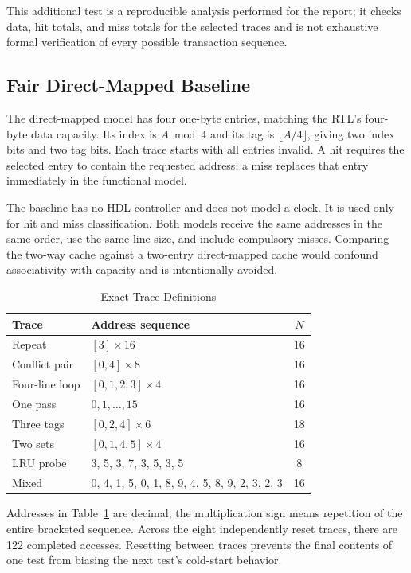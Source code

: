 \documentclass[conference]{IEEEtran}
\begin{document}
This additional test is a reproducible analysis performed for the
report; it checks data, hit totals, and miss totals for the selected
traces and is not exhaustive formal verification of every possible
transaction sequence.

\subsection{Fair Direct-Mapped Baseline}

The direct-mapped model has four one-byte entries, matching the RTL's
four-byte data capacity. Its index is $A \bmod 4$ and its tag is
$\lfloor A/4 \rfloor$, giving two index bits and two tag bits. Each
trace starts with all entries invalid. A hit requires the selected entry
to contain the requested address; a miss replaces that entry immediately
in the functional model.

The baseline has no HDL controller and does not model a clock. It is
used only for hit and miss classification. Both models receive the same
addresses in the same order, use the same line size, and include
compulsory misses. Comparing the two-way cache against a two-entry
direct-mapped cache would confound associativity with capacity and is
intentionally avoided.

\begin{table}[!t]
\caption{Exact Trace Definitions}
\label{tab:traces}
\centering
\begin{tabular}{lp{}c}
\toprule
Trace & Address sequence & $N$ \\
\midrule
Repeat & $[3]\times16$ & 16 \\
Conflict pair & $[0,4]\times8$ & 16 \\
Four-line loop & $[0,1,2,3]\times4$ & 16 \\
One pass & $0,1,\ldots,15$ & 16 \\
Three tags & $[0,2,4]\times6$ & 18 \\
Two sets & $[0,1,4,5]\times4$ & 16 \\
LRU probe & 3, 5, 3, 7, 3, 5, 3, 5 & 8 \\
Mixed & 0, 4, 1, 5, 0, 1, 8, 9, 4, 5, 8, 9, 2, 3, 2, 3 & 16 \\
\bottomrule
\end{tabular}
\end{table}

Addresses in Table~\ref{tab:traces} are decimal; the multiplication
sign means repetition of the entire bracketed sequence. Across the
eight independently reset traces, there are 122 completed accesses.
Resetting between traces prevents the final contents of one test from
biasing the next test's cold-start behavior.
\end{document}
